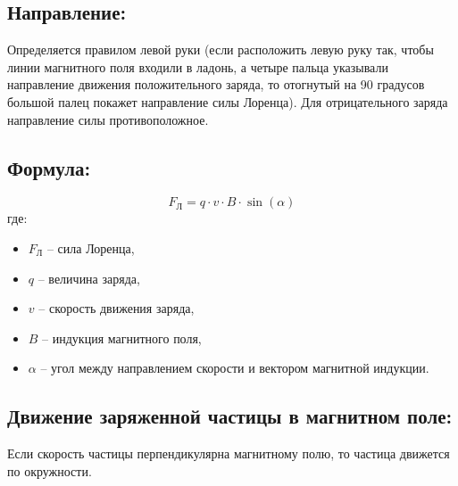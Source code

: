 \documentclass[a4paper,12pt]{article}
\begin{document}
\vspace{-9pt}
\subsection*{Направление:}
\vspace{-3pt}
Определяется правилом левой руки (если расположить левую руку так, чтобы линии магнитного поля входили в ладонь, а четыре пальца указывали направление движения положительного заряда, то отогнутый на 90 градусов большой палец покажет направление силы Лоренца). Для отрицательного заряда направление силы противоположное.

\vspace{-9pt}
\subsection*{Формула:}
\vspace{-3pt} 
\vspace{-0.05em}
$$ F_Л = q \cdot v \cdot B \cdot \sin(\alpha) $$
где:
\begin{itemize}
    \item $F_Л$ – сила Лоренца,
    \item $q$ – величина заряда,
    \item $v$ – скорость движения заряда,
    \item $B$ – индукция магнитного поля,
    \item $\alpha$ – угол между направлением скорости и вектором магнитной индукции.
\end{itemize}

\vspace{-9pt}
\subsection*{Движение заряженной частицы в магнитном поле:}
\vspace{-3pt}
Если скорость частицы перпендикулярна магнитному полю, то частица движется по окружности.
\end{document}
